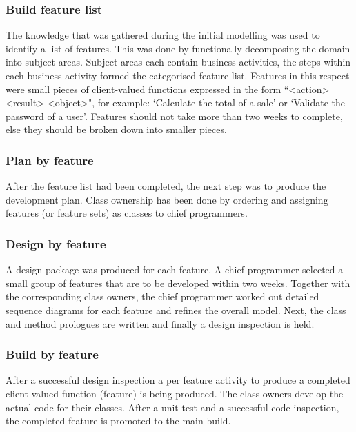 \subsubsection{Build feature list}

The knowledge that was gathered during the initial modelling was used to identify a list of features. This was done by functionally decomposing the domain into subject areas. Subject areas each contain business activities, the steps within each business activity formed the categorised feature list. Features in this respect were small pieces of client-valued functions expressed in the form ``<action> <result> <object>", for example: `Calculate the total of a sale' or `Validate the password of a user'. Features should not take more than two weeks to complete, else they should be broken down into smaller pieces.

\subsubsection{Plan by feature}

After the feature list had been completed, the next step was to produce the development plan. Class ownership has been done by ordering and assigning features (or feature sets) as classes to chief programmers.

\subsubsection{Design by feature}

A design package was produced for each feature. A chief programmer selected a small group of features that are to be developed within two weeks. Together with the corresponding class owners, the chief programmer worked out detailed sequence diagrams for each feature and refines the overall model. Next, the class and method prologues are written and finally a design inspection is held.

\subsubsection{Build by feature}

After a successful design inspection a per feature activity to produce a completed client-valued function (feature) is being produced. The class owners develop the actual code for their classes. After a unit test and a successful code inspection, the completed feature is promoted to the main build.

